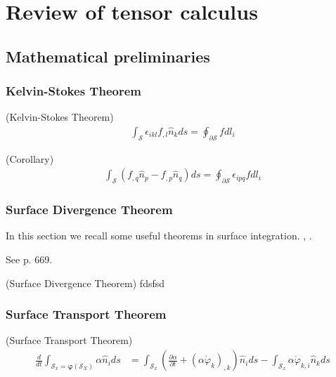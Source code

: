 
\chapter{Review of tensor calculus}




\section{Mathematical preliminaries}

\subsection{Kelvin-Stokes Theorem}
\begin{mytheorem} (Kelvin-Stokes Theorem)
\begin{align}
\int_\mathcal{S} \epsilon_{ikl}f_{,l}\hat{n}_kds=\oint_{\partial\mathcal{S}} f dl_i
\label{KelvinStokes}
\end{align}
\end{mytheorem}

\begin{mytheorem} (Corollary)
\begin{align}
\int_\mathcal{S} \left(f_{,q}\hat{n}_p-f_{,p}\hat{n}_q\right)ds=\oint_{\partial\mathcal{S}} \epsilon_{ipq}f dl_i
\label{KelvinStokesCorollary}
\end{align}
\end{mytheorem}


\subsection{Surface Divergence Theorem}
In this section we recall some useful theorems in surface integration. \cite{Slattery2006}, \cite{Scovazzi2007}.

See \cite{Slattery:2006wn} p. 669.
\begin{mytheorem} (Surface Divergence Theorem)
fdsfsd
\end{mytheorem}

\subsection{Surface Transport Theorem}

\begin{mytheorem} (Surface Transport Theorem)
\begin{align}
\frac{d}{dt}\int_{\mathcal{S}_x=\bm \varphi (\mathcal{S}_X)}\alpha \hat{n}_ids&=\int_{\mathcal{S}_x}\left(\frac{\partial \alpha}{\partial t}+\left(\alpha \dot \varphi_k\right)_{,k}\right)\hat{n}_ids-\int_{\mathcal{S}_x}\alpha \dot\varphi_{k,i}\hat{n}_kds
\label{STT2}
\end{align}
\end{mytheorem}

